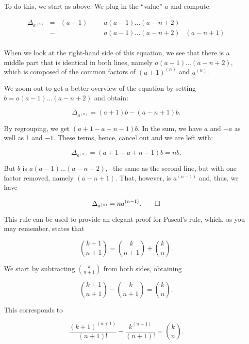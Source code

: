 \documentclass[tikz]{scrreprt}
\begin{document}
To do this, we start as above. We plug in
the ``value'' $a$ and compute:

\begin{align*}
\Delta_{a^{(n)}} & = & (a+1) & & & a(a-1)\dots(a-n+2) & \\
                 & - &       & & & a(a-1)\dots(a-n+2) & (a-n+1)\\
\end{align*}

When we look at the right-hand side of this equation,
we see that there is a middle part that is identical
in both lines, namely $a(a-1)\dots(a-n+2)$,
which is composed of the common factors of
$(a+1)^{(n)}$ and $a^{(n)}$.

We zoom out to get a better overview of the equation
by setting $b=a(a-1)\dots(a-n+2)$ and obtain:

\begin{equation}
  \Delta_{a^{(n)}} = (a+1)b - (a-n+1)b.
\end{equation}

By regrouping, we get $(a+1-a+n-1)b$.
In the sum, we have $a$ and $-a$ as well as 1 and $-1$.
These terms, hence, cancel out and we are left with:

\begin{equation}
  \Delta_{a^{(n)}} = (a+1-a+n-1)b = nb.
\end{equation}

But $b$ is $a(a-1)\dots(a-n+2)$, \ie\ the same
as the second line, but with one factor removed, namely
$(a-n+1)$. That, however, is $a^{(n-1)}$ and, thus,
we have

\begin{equation}
  \Delta_{a^{(n)}} = na^{(n-1)}.\qed
\end{equation}

This rule can be used to provide an elegant proof
for Pascal's rule, which, as you may remember,
states that

\begin{equation}
\binom{k+1}{n+1} = \binom{k}{n+1} + \binom{k}{n}.
\end{equation}

We start by subtracting $\binom{k}{n+1}$
from both sides, obtaining

\begin{equation}
\binom{k+1}{n+1} - \binom{k}{n+1} = \binom{k}{n}.
\end{equation}

This corresponds to

\begin{equation}
\frac{(k+1)^{(n+1)}}{(n+1)!} - \frac{k^{(n+1)}}{(n+1)!} = \binom{k}{n}.
\end{equation}
\end{document}

